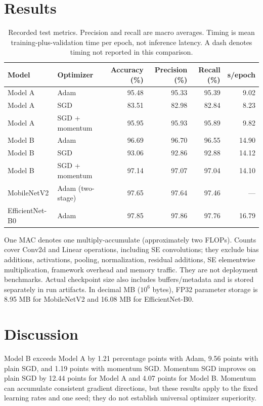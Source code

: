 \documentclass[11pt,a4paper]{article}
\begin{document}
\section{Results}
\begin{table}[htbp]\centering\small
\begin{tabular}{llrrrr}
\toprule
Model & Optimizer & Accuracy (\%) & Precision (\%) & Recall (\%) & s/epoch \\
\midrule
Model A & Adam & 95.48 & 95.33 & 95.39 & 9.02 \\
Model A & SGD & 83.51 & 82.98 & 82.84 & 8.23 \\
Model A & SGD + momentum & 95.95 & 95.93 & 95.89 & 9.82 \\
Model B & Adam & 96.69 & 96.70 & 96.55 & 14.90 \\
Model B & SGD & 93.06 & 92.86 & 92.88 & 14.12 \\
Model B & SGD + momentum & 97.14 & 97.07 & 97.04 & 14.10 \\
\midrule
MobileNetV2 & Adam (two-stage) & 97.65 & 97.64 & 97.46 & --- \\
EfficientNet-B0 & Adam & 97.85 & 97.86 & 97.76 & 16.79 \\
\bottomrule
\end{tabular}
\caption{Recorded test metrics. Precision and recall are macro averages. Timing is mean training-plus-validation time per epoch, not inference latency. A dash denotes timing not reported in this comparison.}
\end{table}
\begin{table}[htbp]\centering\small

\caption{Parameter and operation accounting at $64\times64$, batch one. FP32 storage is parameters times four bytes divided by 1,024; it excludes activations and optimizer state.}
\end{table}
One MAC denotes one multiply-accumulate (approximately two FLOPs). Counts cover Conv2d and Linear operations, including SE convolutions; they exclude bias additions, activations, pooling, normalization, residual additions, SE elementwise multiplication, framework overhead and memory traffic. They are not deployment benchmarks. Actual checkpoint size also includes buffers/metadata and is stored separately in run artifacts. In decimal MB ($10^6$ bytes), FP32 parameter storage is 8.95 MB for MobileNetV2 and 16.08 MB for EfficientNet-B0.

\section{Discussion}
Model B exceeds Model A by 1.21 percentage points with Adam, 9.56 points with plain SGD, and 1.19 points with momentum SGD. Momentum SGD improves on plain SGD by 12.44 points for Model A and 4.07 points for Model B. Momentum can accumulate consistent gradient directions, but these results apply to the fixed learning rates and one seed; they do not establish universal optimizer superiority.
\end{document}
